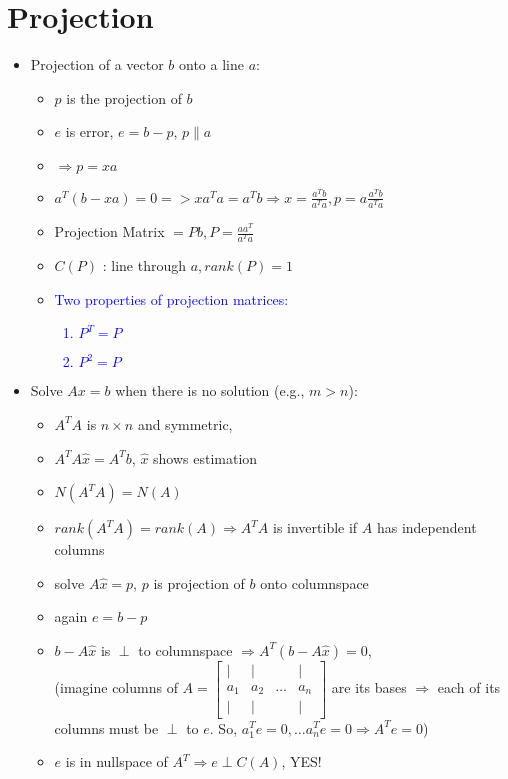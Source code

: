 \documentclass[a4paper,12pt]{article}
\newcommand{\blue}[1]{\textcolor{blue}{#1}}
\begin{document}
\section{Projection}
\begin{itemize}
	\item Projection of a vector $b$ onto a line $a$:
	\begin{itemize}
		\item $p$ is the projection of $b$
		\item $e$ is error, $e=b-p$, $p \parallel  a$
		\item $\Rightarrow p = xa$
		\item $a^T ( b - xa) = 0 => x a^T a = a^T b \Rightarrow x = \frac{a^T b}{a^T a}, p = a \frac{a^T b}{a^T a}$
		\item Projection Matrix $= P b, P = \frac{a a^T}{a^T a}$
		\item $C(P)$ : line through $a, rank(P) = 1$
		\item \blue{Two properties of projection matrices:
		\begin{enumerate}
			\item $P^T = P$
			\item $P^2 = P$
		\end{enumerate}}
	\end{itemize}
	
	\item Solve $Ax=b$ when there is no solution (e.g., $m > n$):
		\begin{itemize}
			\item $A^T A$ is $n \times n$ and symmetric,
			\item $A^T A \hat{x} = A^T b$, $\hat{x}$ shows estimation
			\item $N(A^T A ) = N(A)$
			\item $rank(A^T A) = rank(A) \Rightarrow A^T A$ is invertible if $A$ has independent columns
			\item solve $A\hat{x}=p$, $p$ is projection of $b$ onto columnspace
			\item again $e = b - p$
			\item $b- A\hat{x}$ is $\perp$ to columnspace $ \Rightarrow A^T ( b - A\hat{x}) = 0$, \\
			 (imagine columns of $
			A = \begin{bmatrix}
			\mid & \mid  &		   &\mid \\
			a_1   & a_2    & \ldots & a_n  \\
			\mid & \mid  &		   &\mid
			\end{bmatrix}$			
			  are its bases $\Rightarrow$ each of its columns must be $\perp$ to $e$. So,  $a_1^T e = 0, \ldots a_n^T e = 0 \Longrightarrow A^T e = 0$)
			  \item $e$ is in nullspace of $A^T \Longrightarrow e \perp  C(A)$, YES!
			  

\end{itemize}
\end{itemize}
\end{document}
